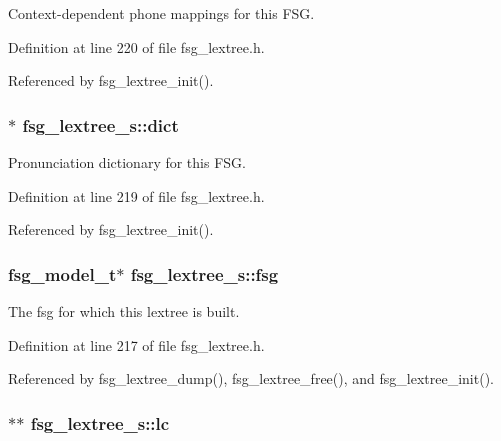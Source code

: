 \-Context-\/dependent phone mappings for this \-F\-S\-G. 



\-Definition at line 220 of file fsg\-\_\-lextree.\-h.



\-Referenced by fsg\-\_\-lextree\-\_\-init().

\subsubsection[{dict}]{$\ast$ {\bf fsg\-\_\-lextree\-\_\-s\-::dict}}\label{structfsg__lextree__s_abf077af1c0dd1246b2032b917bfacba5}


\-Pronunciation dictionary for this \-F\-S\-G. 



\-Definition at line 219 of file fsg\-\_\-lextree.\-h.



\-Referenced by fsg\-\_\-lextree\-\_\-init().

\subsubsection[{fsg}]{\setlength{\rightskip}{0pt plus 5cm}fsg\-\_\-model\-\_\-t$\ast$ {\bf fsg\-\_\-lextree\-\_\-s\-::fsg}}\label{structfsg__lextree__s_a161ff35c65373388f18e51236bf7ef5f}


\-The fsg for which this lextree is built. 



\-Definition at line 217 of file fsg\-\_\-lextree.\-h.



\-Referenced by fsg\-\_\-lextree\-\_\-dump(), fsg\-\_\-lextree\-\_\-free(), and fsg\-\_\-lextree\-\_\-init().

\subsubsection[{lc}]{$\ast$$\ast$ {\bf fsg\-\_\-lextree\-\_\-s\-::lc}}\label{structfsg__lextree__s_a0655f40ec98c9d971aba1fa8a894575d}


